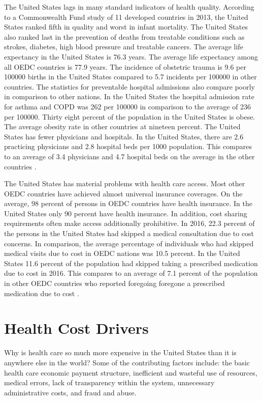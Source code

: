 \documentclass[sigconf]{acmart}
\begin{document}
The United States lags in many standard indicators of health quality.  According to a Commonwealth Fund study of 11 developed countries in 2013, the United States ranked fifth in quality and worst in infant mortality. The United States also ranked last in the prevention of deaths from treatable conditions such as strokes, diabetes, high blood pressure and treatable cancers.  The average life expectancy in the United States is 76.3 years.  The average life expectancy among all OEDC countries is 77.9 years.  The incidence of obstetric trauma is 9.6 per 100000 births in the United States compared to 5.7 incidents per 100000 in other countries. The statistics for preventable hospital admissions also compare poorly in comparison to other nations. In the United States the hospital admission rate for asthma and COPD was 262 per 100000 in comparison to the average of 236 per 100000. Thirty eight percent of the population in the United States is obese. The average obesity rate in other countries at nineteen percent.  The United States has fewer physicians and hospitals.  In the United States, there are 2.6 practicing physicians and 2.8 hospital beds per 1000 population. This compares to an average of 3.4 physicians and 4.7 hospital beds on the average in the other countries \cite{OEDC}. 

The United States has material problems with health care access.  Most other OEDC countries have achieved almost universal insurance coverages. On the average, 98 percent of persons in OEDC countries have health insurance. In the United States only 90 percent have health insurance.  In addition, cost sharing requirements often make access additionally prohibitive.   In 2016, 22.3 percent of the persons in the United States had skipped a medical consultation due to cost concerns. In comparison, the average percentage of individuals who had skipped medical visits due to cost in OEDC nations was 10.5 percent.  In the United States 11.6 percent of the population had skipped taking a prescribed medication due to cost in 2016. This compares to an average of 7.1 percent of the population in other OEDC countries who reported foregoing foregone a prescribed medication due to cost \cite{OEDC}.


\section{Health Cost Drivers}
Why is health care so much more expensive in the United States than it is anywhere else in the world?  Some of the contributing factors include: the basic health care economic payment structure, inefficient and wasteful use of resources, medical errors, lack of transparency within the system, unnecessary administrative costs, and fraud and abuse.
\end{document}
